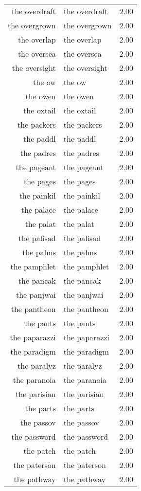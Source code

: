 \begin{table}[ht]
\begin{tabular}{rlr}
  the overdraft & the overdraft & 2.00 \\ 
  the overgrown & the overgrown & 2.00 \\ 
  the overlap & the overlap & 2.00 \\ 
  the oversea & the oversea & 2.00 \\ 
  the oversight & the oversight & 2.00 \\ 
  the ow & the ow & 2.00 \\ 
  the owen & the owen & 2.00 \\ 
  the oxtail & the oxtail & 2.00 \\ 
  the packers & the packers & 2.00 \\ 
  the paddl & the paddl & 2.00 \\ 
  the padres & the padres & 2.00 \\ 
  the pageant & the pageant & 2.00 \\ 
  the pages & the pages & 2.00 \\ 
  the painkil & the painkil & 2.00 \\ 
  the palace & the palace & 2.00 \\ 
  the palat & the palat & 2.00 \\ 
  the palisad & the palisad & 2.00 \\ 
  the palms & the palms & 2.00 \\ 
  the pamphlet & the pamphlet & 2.00 \\ 
  the pancak & the pancak & 2.00 \\ 
  the panjwai & the panjwai & 2.00 \\ 
  the pantheon & the pantheon & 2.00 \\ 
  the pants & the pants & 2.00 \\ 
  the paparazzi & the paparazzi & 2.00 \\ 
  the paradigm & the paradigm & 2.00 \\ 
  the paralyz & the paralyz & 2.00 \\ 
  the paranoia & the paranoia & 2.00 \\ 
  the parisian & the parisian & 2.00 \\ 
  the parts & the parts & 2.00 \\ 
  the passov & the passov & 2.00 \\ 
  the password & the password & 2.00 \\ 
  the patch & the patch & 2.00 \\ 
  the paterson & the paterson & 2.00 \\ 
  the pathway & the pathway & 2.00 \\ 

\end{tabular}
\end{table}
